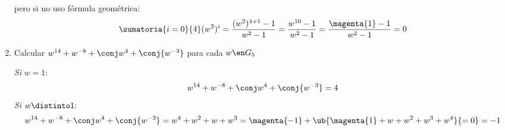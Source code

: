 \begin{enumerate}[label=\alph*)]
          pero si no uso fórmula geométrica:
        $$
        \sumatoria{i = 0}{4} (w^2)^i  =
        \frac{(w^2)^{4 + 1} - 1}{w^2 - 1} =
        \frac{w^{10} - 1}{w^2 - 1} =
        \frac{\magenta{1} - 1}{w^2 - 1} = 0
        $$

  \item Calcular $w^{14} + w^{-8} + \conj w^4 + \conj{w^{-3}}$
        para cada $w \en G_5$

        \separadorCorto

        \textit{Si} $w = 1$:
        $$
          w^{14} + w^{-8} + \conj w^4 + \conj{w^{-3}} = 4
        $$
        \textit{Si} $w \distinto 1$:
        $$
          w^{14} + w^{-8} + \conj w^4 + \conj{w^{-3}} =
          w^4 + w^2 + w + w^3 =
          \magenta{-1} + \ub{\magenta{1} + w + w^2 + w^3 + w^4}{= 0} = -1
        $$
\end{enumerate}

\begin{aportes}
  \item {}
\end{aportes}
